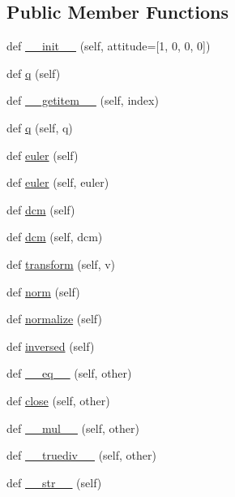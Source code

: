 \subsection*{Public Member Functions}
\begin{DoxyCompactItemize}
\item 
def \mbox{\hyperlink{classpymavlink_1_1quaternion_1_1QuaternionBase_a6bfc9e17d697406593e6757969c36bf2}{\+\_\+\+\_\+init\+\_\+\+\_\+}} (self, attitude=\mbox{[}1, 0, 0, 0\mbox{]})
\item 
def \mbox{\hyperlink{classpymavlink_1_1quaternion_1_1QuaternionBase_a5afdd0b6ec9069e6f0e0bf2032cf9fe6}{q}} (self)
\item 
def \mbox{\hyperlink{classpymavlink_1_1quaternion_1_1QuaternionBase_a2877818e54a5c9bc1a39caf4ce0fddf5}{\+\_\+\+\_\+getitem\+\_\+\+\_\+}} (self, index)
\item 
def \mbox{\hyperlink{classpymavlink_1_1quaternion_1_1QuaternionBase_adf7daed709c0f21d0225039830450543}{q}} (self, q)
\item 
def \mbox{\hyperlink{classpymavlink_1_1quaternion_1_1QuaternionBase_a05ce9891b63e3b83fc52521581ddba5e}{euler}} (self)
\item 
def \mbox{\hyperlink{classpymavlink_1_1quaternion_1_1QuaternionBase_a3bc9e70528ac1880ec02a69c9fe86c26}{euler}} (self, euler)
\item 
def \mbox{\hyperlink{classpymavlink_1_1quaternion_1_1QuaternionBase_a534fc3e09f0c3b65e8fe5105d39e4891}{dcm}} (self)
\item 
def \mbox{\hyperlink{classpymavlink_1_1quaternion_1_1QuaternionBase_a2da4adc7fb783fe3d4e3c4d92f3ac91e}{dcm}} (self, dcm)
\item 
def \mbox{\hyperlink{classpymavlink_1_1quaternion_1_1QuaternionBase_a747068d71180696e5131e2ca31c2a13c}{transform}} (self, v)
\item 
def \mbox{\hyperlink{classpymavlink_1_1quaternion_1_1QuaternionBase_a9b204e22c7e9e0625a84ef16d8b87755}{norm}} (self)
\item 
def \mbox{\hyperlink{classpymavlink_1_1quaternion_1_1QuaternionBase_aec2e9571fc65fcda925d8be556ce949b}{normalize}} (self)
\item 
def \mbox{\hyperlink{classpymavlink_1_1quaternion_1_1QuaternionBase_a6d4db8c4ecf5f04d0ebaf798d17605cf}{inversed}} (self)
\item 
def \mbox{\hyperlink{classpymavlink_1_1quaternion_1_1QuaternionBase_acf052c96499b7df3c5d535e7e6615197}{\+\_\+\+\_\+eq\+\_\+\+\_\+}} (self, other)
\item 
def \mbox{\hyperlink{classpymavlink_1_1quaternion_1_1QuaternionBase_ae368fa4a7df294b50db40a17d20c0908}{close}} (self, other)
\item 
def \mbox{\hyperlink{classpymavlink_1_1quaternion_1_1QuaternionBase_a694593af9f5007fc418b1473c3b32496}{\+\_\+\+\_\+mul\+\_\+\+\_\+}} (self, other)
\item 
def \mbox{\hyperlink{classpymavlink_1_1quaternion_1_1QuaternionBase_acdb6fa13b26fc10c02eb40ee51de6899}{\+\_\+\+\_\+truediv\+\_\+\+\_\+}} (self, other)
\item 
def \mbox{\hyperlink{classpymavlink_1_1quaternion_1_1QuaternionBase_a2c8b45efc655d4220042a132c4255f01}{\+\_\+\+\_\+str\+\_\+\+\_\+}} (self)
\end{DoxyCompactItemize}
